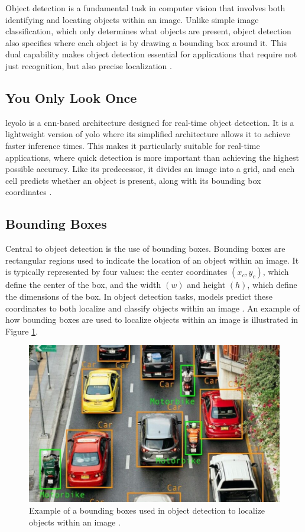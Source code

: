 Object detection is a fundamental task in computer vision that involves both identifying and locating objects within an image. Unlike simple image classification, which only determines what objects are present, object detection also specifies where each object is by drawing a bounding box around it. This dual capability makes object detection essential for applications that require not just recognition, but also precise localization \cite{ibm:object-detection}. \\

\subsection{You Only Look Once}

\gls{leyolo} is a \gls{cnn}-based architecture designed for real-time object detection. It is a lightweight version of \gls{yolo} where its simplified architecture allows it to achieve faster inference times. This makes it particularly suitable for real-time applications, where quick detection is more important than achieving the highest possible accuracy. Like its predecessor, it divides an image into a grid, and each cell predicts whether an object is present, along with its bounding box coordinates \cite{openreview:leyolo}.\\

\subsection{Bounding Boxes}

Central to object detection is the use of bounding boxes. Bounding boxes are rectangular regions used to indicate the location of an object within an image. It is typically represented by four values: the center coordinates \((x_c, y_c)\), which define the center of the box, and the width \((w)\) and height \((h)\), which define the dimensions of the box. In object detection tasks, models predict these coordinates to both localize and classify objects within an image \cite{peopleforai:boundingbox}. An example of how bounding boxes are used to localize objects within an image is illustrated in Figure \ref{fig:boundingbox}.

\begin{figure}[h!]
    \centering
    \includegraphics[width=0.60\linewidth]{figures/theory/image-recognition/bbox-example.png}
    \caption[Bounding box in object detection]{Example of a bounding boxes used in object detection to localize objects within an image \cite{peopleforai:boundingbox}.}
    \label{fig:boundingbox}
\end{figure}

